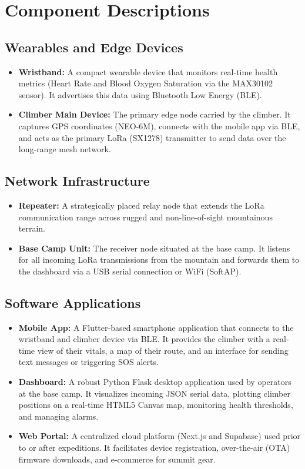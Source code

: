 \section{Component Descriptions}

\subsection{Wearables and Edge Devices}
\begin{itemize}
    \item \textbf{Wristband:} A compact wearable device that monitors real-time health metrics (Heart Rate and Blood Oxygen Saturation via the MAX30102 sensor). It advertises this data using Bluetooth Low Energy (BLE).
    \item \textbf{Climber Main Device:} The primary edge node carried by the climber. It captures GPS coordinates (NEO-6M), connects with the mobile app via BLE, and acts as the primary LoRa (SX1278) transmitter to send data over the long-range mesh network.
\end{itemize}

\subsection{Network Infrastructure}
\begin{itemize}
    \item \textbf{Repeater:} A strategically placed relay node that extends the LoRa communication range across rugged and non-line-of-sight mountainous terrain.
    \item \textbf{Base Camp Unit:} The receiver node situated at the base camp. It listens for all incoming LoRa transmissions from the mountain and forwards them to the dashboard via a USB serial connection or WiFi (SoftAP).
\end{itemize}

\subsection{Software Applications}
\begin{itemize}
    \item \textbf{Mobile App:} A Flutter-based smartphone application that connects to the wristband and climber device via BLE. It provides the climber with a real-time view of their vitals, a map of their route, and an interface for sending text messages or triggering SOS alerts.
    \item \textbf{Dashboard:} A robust Python Flask desktop application used by operators at the base camp. It visualizes incoming JSON serial data, plotting climber positions on a real-time HTML5 Canvas map, monitoring health thresholds, and managing alarms.
    \item \textbf{Web Portal:} A centralized cloud platform (Next.js and Supabase) used prior to or after expeditions. It facilitates device registration, over-the-air (OTA) firmware downloads, and e-commerce for summit gear.
\end{itemize}

